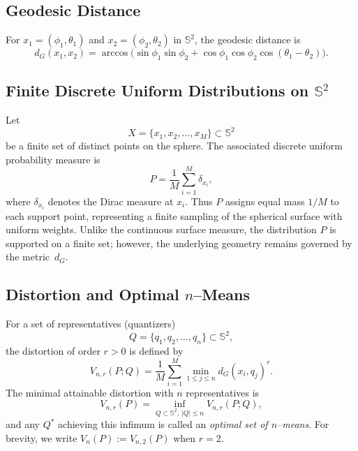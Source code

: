 \documentclass[12pt, reqno]{amsart}
\theoremstyle{plain}
\theoremstyle{definition}
\newcommand{\D}[1]{\mathbb{#1}}%
\begin{document}
\subsection{Geodesic Distance}

For $ {x}_1 = (\phi_1,\theta_1)$ and $ {x}_2 = (\phi_2,\theta_2)$ in $\D S^2$, the geodesic distance is
\begin{equation}\label{eq:geodesic-distance}
d_G( {x}_1, {x}_2)
= \arccos\!\big( \sin\phi_1 \sin\phi_2 + \cos\phi_1 \cos\phi_2 \cos(\theta_1 - \theta_2) \big).
\end{equation}

\subsection{Finite Discrete Uniform Distributions on $\D S^2$}

Let
\[
 {X} = \{ {x}_1,  {x}_2, \ldots,  {x}_M\} \subset \D S^2
\]
be a finite set of distinct points on the sphere. The associated discrete uniform probability measure is
\begin{equation}\label{eq:uniform-measure}
P = \frac{1}{M} \sum_{i=1}^M \delta_{ {x}_i},
\end{equation}
where $\delta_{ {x}_i}$ denotes the Dirac measure at $ {x}_i$. Thus $P$ assigns equal mass $1/M$ to each support point, representing a finite sampling
of the spherical surface with uniform weights.
Unlike the continuous surface measure, the distribution $P$ is supported on a finite
set; however, the underlying geometry remains governed by the metric~$d_{G}$.

\subsection{Distortion and Optimal $n$--Means}

For a set of representatives (quantizers)
\[
 {Q} = \{ {q}_1,  {q}_2, \ldots,  {q}_n\} \subset \D S^2,
\]
the distortion of order $r>0$ is defined by
\begin{equation}\label{eq:distortion}
V_{n,r}(P; {Q})
= \frac{1}{M} \sum_{i=1}^M \min_{1 \le j \le n} d_G( {x}_i, {q}_j)^r .
\end{equation}
The minimal attainable distortion with $n$ representatives is
\begin{equation}
V_{n,r}(P) = \inf_{ {Q} \subset \D S^2,\, | {Q}| \le n} V_{n,r}(P; {Q}),
\end{equation}
and any $ {Q}^*$ achieving this infimum is called an \emph{optimal set of $n$--means}.
For brevity, we write $V_n(P) := V_{n,2}(P)$ when $r=2$.
\end{document}
